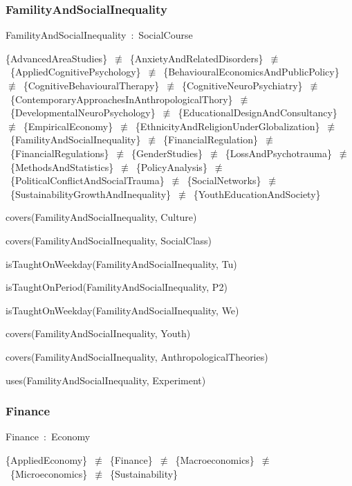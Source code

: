 \documentclass{article}
\begin{document}
\subsubsection*{FamilityAndSocialInequality}

FamilityAndSocialInequality~:~SocialCourse

\{AdvancedAreaStudies\}~\ensuremath{\not\equiv}~\{AnxietyAndRelatedDisorders\}~\ensuremath{\not\equiv}~\{AppliedCognitivePsychology\}~\ensuremath{\not\equiv}~\{BehaviouralEconomicsAndPublicPolicy\}~\ensuremath{\not\equiv}~\{CognitiveBehaviouralTherapy\}~\ensuremath{\not\equiv}~\{CognitiveNeuroPsychiatry\}~\ensuremath{\not\equiv}~\{ContemporaryApproachesInAnthropologicalThory\}~\ensuremath{\not\equiv}~\{DevelopmentalNeuroPsychology\}~\ensuremath{\not\equiv}~\{EducationalDesignAndConsultancy\}~\ensuremath{\not\equiv}~\{EmpiricalEconomy\}~\ensuremath{\not\equiv}~\{EthnicityAndReligionUnderGlobalization\}~\ensuremath{\not\equiv}~\{FamilityAndSocialInequality\}~\ensuremath{\not\equiv}~\{FinancialRegulation\}~\ensuremath{\not\equiv}~\{FinancialRegulations\}~\ensuremath{\not\equiv}~\{GenderStudies\}~\ensuremath{\not\equiv}~\{LossAndPsychotrauma\}~\ensuremath{\not\equiv}~\{MethodsAndStatistics\}~\ensuremath{\not\equiv}~\{PolicyAnalysis\}~\ensuremath{\not\equiv}~\{PoliticalConflictAndSocialTrauma\}~\ensuremath{\not\equiv}~\{SocialNetworks\}~\ensuremath{\not\equiv}~\{SustainabilityGrowthAndInequality\}~\ensuremath{\not\equiv}~\{YouthEducationAndSociety\}

covers(FamilityAndSocialInequality, Culture)

covers(FamilityAndSocialInequality, SocialClass)

isTaughtOnWeekday(FamilityAndSocialInequality, Tu)

isTaughtOnPeriod(FamilityAndSocialInequality, P2)

isTaughtOnWeekday(FamilityAndSocialInequality, We)

covers(FamilityAndSocialInequality, Youth)

covers(FamilityAndSocialInequality, AnthropologicalTheories)

uses(FamilityAndSocialInequality, Experiment)

\subsubsection*{Finance}

Finance~:~Economy

\{AppliedEconomy\}~\ensuremath{\not\equiv}~\{Finance\}~\ensuremath{\not\equiv}~\{Macroeconomics\}~\ensuremath{\not\equiv}~\{Microeconomics\}~\ensuremath{\not\equiv}~\{Sustainability\}
\end{document}
